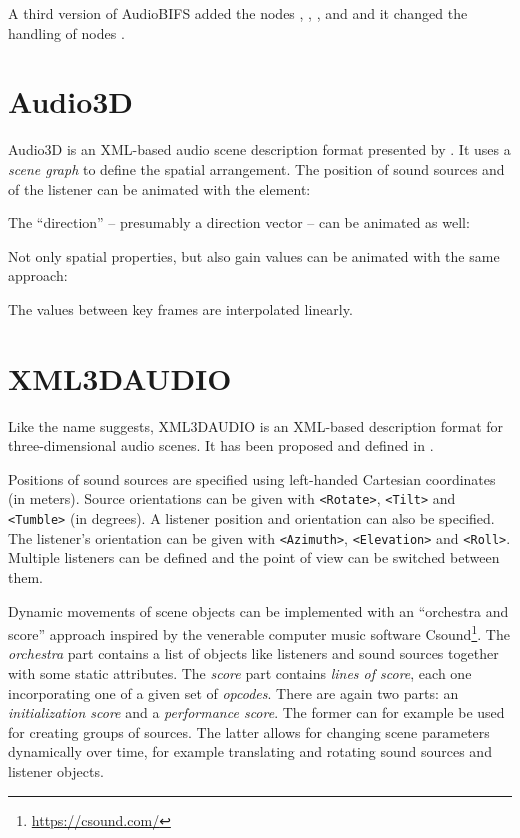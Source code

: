 A third version of AudioBIFS added the nodes
,
,
,
 and
and it changed the handling of  nodes
\parencite{schmidt2004mpeg4}.


\section{Audio3D}

Audio3D is an
XML-based audio scene description format
presented by \textcite{hoffmann2003audio3d}.
It uses a \emph{scene graph} to define the spatial arrangement.
The position of sound sources and of the listener can be animated
with the  element:


\noindent
The ``direction'' -- presumably a direction vector -- can be animated as well:


\noindent
Not only spatial properties,
but also gain values can be animated with the same approach:


\noindent
The values between key frames are interpolated linearly.


\section{XML3DAUDIO}

Like the name suggests,
XML3DAUDIO is
an XML-based description format for
three-dimensional audio scenes.
It has been proposed and defined in
\parencite{potard2002schema,potard2003encoding,potard2004xml,potard2006object}.

Positions of sound sources are specified using
left-handed Cartesian coordinates (in meters).
Source orientations can be given with
\texttt{<Rotate>},
\texttt{<Tilt>} and
\texttt{<Tumble>} (in degrees).
A listener position and orientation can also be specified.
The listener's orientation can be given with
\texttt{<Azimuth>},
\texttt{<Elevation>} and
\texttt{<Roll>}.
Multiple listeners can be defined
and the point of view can be switched between them.

Dynamic movements of scene objects can be implemented with an
``orchestra and score'' approach
inspired by the venerable computer music software
Csound\footnote{\url{https://csound.com/}}.
The \emph{orchestra} part contains a list of objects
like listeners and sound sources together with some static attributes.
The \emph{score} part
contains \emph{lines of score},
each one incorporating one of a given set of \emph{opcodes}.
There are again two parts:
an \emph{initialization score} and a \emph{performance score}.
The former can for example be used for creating groups of sources.
The latter allows for changing scene parameters dynamically over time,
for example translating and rotating sound sources and listener objects.

